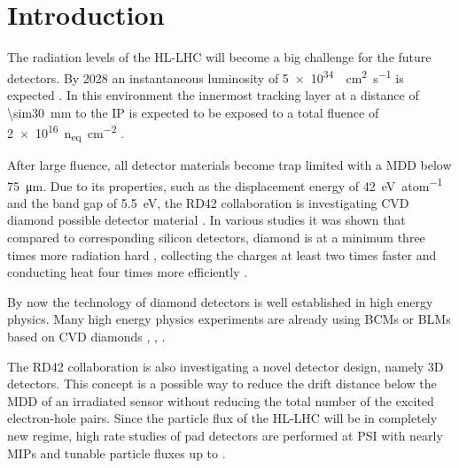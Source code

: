\section{Introduction}
The radiation levels of the \ac{HL-LHC} will become a big challenge for the future detectors. By 2028 an instantaneous luminosity of \SI{5e34}{\per\centi\meter\squared\per\second} is expected \cite{hllhc}. In this environment the innermost tracking layer at a distance of \SI{\sim30}{\milli\meter} to the \acl{IP} is expected to be exposed to a total fluence of \SI{2e16}{n_{eq}\per \centi\meter^2} \cite{auzinger}.\par
After large fluence, all detector materials become trap limited with a \acl{MDD} below \SI{75}{\micro\meter}. Due to its properties, such as the displacement energy of \SI{42}{\electronvolt\per atom} and the band gap of \SI{5.5}{\electronvolt}, the RD42 collaboration is investigating \ac{CVD} diamond possible detector material \cite{rd42}. In various studies it was shown that compared to corresponding silicon detectors, diamond is at a minimum three times more radiation hard \cite{deboer}, collecting the charges at least two times faster \cite{pernegger} and conducting heat four times more efficiently \cite{zhao}.\par
By now the technology of diamond detectors is well established in high energy physics. Many high energy physics experiments are already using \aclp{BCM} or \aclp{BLM} based on \ac{CVD} diamonds \cite{babar}, \cite{bcm}, \cite{dbm1}.\par
The RD42 collaboration is also investigating a novel detector design, namely 3D detectors. This concept is a possible way to reduce the drift distance below the \acl{MDD} of an irradiated sensor without reducing the total number of the excited electron-hole pairs. Since the particle flux of the \ac{HL-LHC} will be in completely new regime, high rate studies of pad detectors are performed at \ac{PSI} with nearly \acp{MIP} and tunable particle fluxes up to .
